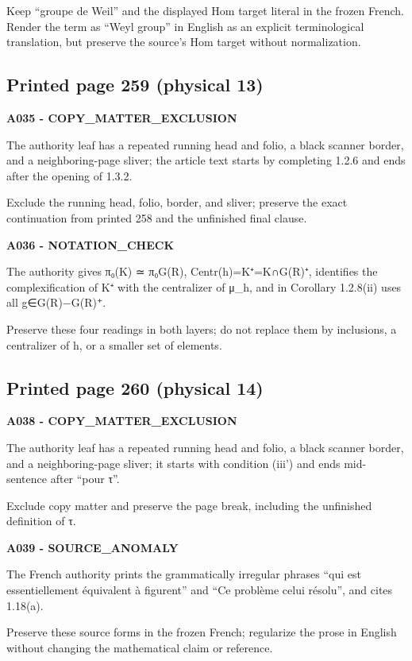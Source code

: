 \documentclass[10pt,a4paper]{article}
\begin{document}
Keep ``groupe de Weil'' and the displayed Hom target literal in the frozen French. Render the term as ``Weyl group'' in English as an explicit terminological translation, but preserve the source's Hom target without normalization.

\subsection{Printed page 259 (physical 13)}

\textbf{A035 - COPY\_MATTER\_EXCLUSION}

The authority leaf has a repeated running head and folio, a black scanner border, and a neighboring-page sliver; the article text starts by completing 1.2.6 and ends after the opening of 1.3.2.

Exclude the running head, folio, border, and sliver; preserve the exact continuation from printed 258 and the unfinished final clause.

\textbf{A036 - NOTATION\_CHECK}

The authority gives π₀(K) ≃ π₀G(R), Centr(h)=K⁺=K∩G(R)⁺, identifies the complexification of K⁺ with the centralizer of μ\_h, and in Corollary 1.2.8(ii) uses all g∈G(R)−G(R)⁺.

Preserve these four readings in both layers; do not replace them by inclusions, a centralizer of h, or a smaller set of elements.

\subsection{Printed page 260 (physical 14)}

\textbf{A038 - COPY\_MATTER\_EXCLUSION}

The authority leaf has a repeated running head and folio, a black scanner border, and a neighboring-page sliver; it starts with condition (iii') and ends mid-sentence after ``pour τ''.

Exclude copy matter and preserve the page break, including the unfinished definition of τ.

\textbf{A039 - SOURCE\_ANOMALY}

The French authority prints the grammatically irregular phrases ``qui est essentiellement équivalent à figurent'' and ``Ce problème celui résolu'', and cites 1.18(a).

Preserve these source forms in the frozen French; regularize the prose in English without changing the mathematical claim or reference.
\end{document}
